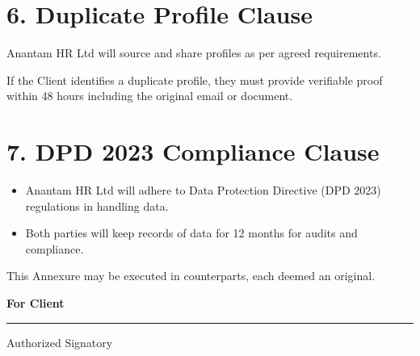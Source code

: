 \documentclass{article}
\begin{document}
\section*{6. Duplicate Profile Clause}

Anantam HR Ltd will source and share profiles as per agreed requirements.

If the Client identifies a duplicate profile, they must provide verifiable proof within 48 hours including the original email or document.

\section*{7. DPD 2023 Compliance Clause}

\begin{itemize}
\item Anantam HR Ltd will adhere to Data Protection Directive (DPD 2023) regulations in handling data.
\item Both parties will keep records of data for 12 months for audits and compliance.
\end{itemize}

\bigskip
This Annexure may be executed in counterparts, each deemed an original.

\bigskip
\textbf{For Client}

\vspace{2cm}

\noindent\rule{6cm}{0.4pt}  
Authorized Signatory
\end{document}
